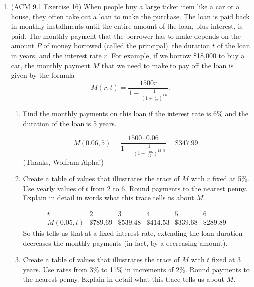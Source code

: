 \documentclass[10pt]{article}
\newenvironment{red}{\color{red}}{\ignorespacesafterend}
\begin{document}
\begin{enumerate}[leftmargin=0pt]
\begin{enumerate}
        \red{Increasing temperature increases volume (proportionally). Increasing pressure decreases volume (in inverse proportion). If we hold volume constant, then increasing temperature increases pressure, and increasing pressure increases temperature.}
    \end{enumerate}
    \item (ACM 9.1 Exercise 16) When people buy a large ticket item like a car or a house, they often take out a loan to make the purchase. The loan is paid back in monthly installments until the entire amount of the loan, plus interest, is paid. The monthly payment that the borrower has to make depends on the amount $P$ of money borrowed (called the principal), the duration $t$ of the loan in years, and the interest rate $r$. For example, if we borrow \$18,000 to buy a car, the monthly payment $M$ that we need to make to pay off the loan is given by the formula \[M(r,t) = \frac{1500r}{1-\frac{1}{\left(1+\frac{r}{12}\right)^{12t}}}.\]
    \begin{enumerate}
        \item Find the monthly payments on this loan if the interest rate is 6\% and the duration of the loan is 5 years.
        
        \begin{red}
        \[M(0.06, 5) = \frac{1500\cdot 0.06}
        {1-\frac{1}{\left(1+\frac{0.06}{12}\right)^{12\cdot 5}}} = \$347.99.\]
        (Thanks, Wolfram$|$Alpha!)
        \end{red}
        \item Create a table of values that illustrates the trace of $M$ with $r$ fixed at 5\%. Use yearly values of $t$ from 2 to 6. Round payments to the nearest penny. Explain in detail in words what this trace tells us about $M$.
        
        \begin{red}
        \[
        \begin{array}{c|c|c|c|c|c}
            t          & 2        & 3        & 4        & 5        & 6        \\
            \hline
            M(0.05, t) & \$789.69 & \$539.48 & \$414.53 & \$339.68 & \$289.89
        \end{array}
        \]
        So this tells us that at a fixed interest rate, extending the loan duration decreases the monthly payments (in fact, by a decreasing amount).
        \end{red}
        \item Create a table of values that illustrates the trace of $M$ with $t$ fixed at 3 years. Use rates from 3\% to 11\% in increments of 2\%. Round payments to the nearest penny. Explain in detail what this trace tells us about $M$.
        

\end{enumerate}
\end{enumerate}
\end{document}
